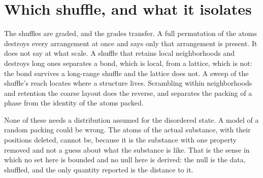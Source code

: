 \section{Which shuffle, and what it isolates}

The shuffles are graded, and the grades transfer. A full permutation of the atoms destroys every
arrangement at once and says only that arrangement is present. It does not say at what scale. A shuffle that
retains local neighborhoods and destroys long ones separates a bond, which is local, from a lattice,
which is not: the bond survives a long-range shuffle and the lattice does not. A sweep of the
shuffle's reach locates where a structure lives. Scrambling within neighborhoods and retention the
coarse layout does the reverse, and separates the packing of a phase from the identity of the atoms
packed.

None of these needs a distribution assumed for the disordered state. A model of a random packing
could be wrong. The atoms of the actual substance, with their positions deleted, cannot be, because
it is the substance with one property removed and not a guess about what the substance is like.
That is the sense in which no set here is bounded and no null here is derived: the null is the data,
shuffled, and the only quantity reported is the distance to it.
